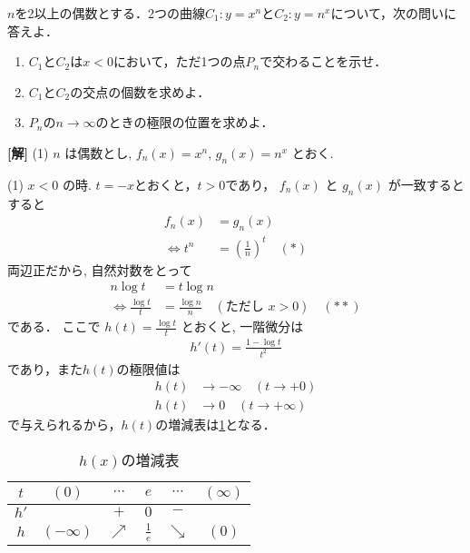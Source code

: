 \documentclass[a4paper,10pt]{ltjsarticle}
\begin{document}
\begin{oframed}
  $n$を2以上の偶数とする．2つの曲線$C_1: y=x^n$と$C_2: y=n^x$について，次の問いに答えよ．

  \begin{enumerate}
    \item $C_1$と$C_2$は$x<0$において，ただ1つの点$P_n$で交わることを示せ．
    \item $C_1$と$C_2$の交点の個数を求めよ．
    \item $P_n$の$n \to \infty$のときの極限の位置を求めよ．
  \end{enumerate}
\end{oframed}


\setlength{\columnseprule}{0.4pt}
\begin{multicols}{2}
  {\bf[解]}
  (1)
  $n$ は偶数とし, $f_n(x) = x^n$, $g_n(x) = n^x$ とおく.

  (1) $x < 0$ の時. $t=-x$とおくと，$t>0$であり，
  $f_n(x)$ と $g_n(x)$ が一致するとすると
  \begin{align*}
    f_n(x) & = g_n(x)                                  \\
    \iff
    t^n    & = \left(\frac{1}{n}\right)^t \quad (\ast)
  \end{align*}
  両辺正だから, 自然対数をとって
  \begin{align}
    n \log t         & = t\log n  \nonumber                                                       \\
    \iff
    \frac{\log t}{t} & = \frac{\log n}{n} \quad (\text{ただし } x > 0) \quad (\ast\ast) \label{eq:1}
  \end{align}
  である．
  ここで $h(t) = \frac{\log t}{t}$ とおくと, 一階微分は
  \begin{align*}
    h'(t) = \frac{1 - \log t}{t^2}
  \end{align*}
  であり，また$h(t)$の極限値は
  \begin{align*}
    h(t) & \to -\infty \quad (t \to +0) \\
    h(t) & \to 0 \quad (t \to +\infty)
  \end{align*}
  で与えられるから，$h(t)$の増減表は\cref{table:1}となる．

  \begin{table}[H]
    \centering
    \caption{$h(x)$の増減表}
    \label{table:1}
    \begin{tabular}{|c|c|c|c|c|c|}
      \hline
      $t$  & $(0)$       & $\cdots$   & $e$           & $\cdots$   & $(\infty)$ \\
      \hline
      $h'$ &             & $+$        & $0$           & $-$        &            \\
      \hline
      $h$  & $(-\infty)$ & $\nearrow$ & $\frac{1}{e}$ & $\searrow$ & $(0)$      \\
      \hline
    \end{tabular}
  \end{table}


\end{multicols}
\end{document}
